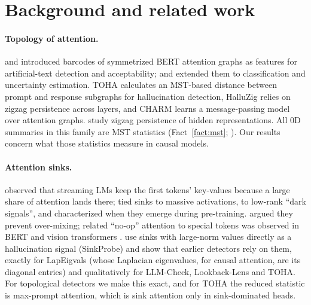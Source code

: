 \documentclass{article}
\theoremstyle{definition}
\begin{document}
\section{Background and related work}
\label{sec:related}

\paragraph{Topology of attention.} \citet{kushnareva2021} and \citet{cherniavskii2022} introduced barcodes of symmetrized BERT attention graphs as features for artificial-text detection and acceptability; \citet{perez2022topological} and \citet{kostenok2023} extended them to classification and uncertainty estimation. TOHA \citep{toha} calculates an MST-based distance between prompt and response subgraphs for hallucination detection, HalluZig \citep{samaga2026halluzig} relies on zigzag persistence across layers, and CHARM \citep{charm} learns a message-passing model over attention graphs. \citet{gardinazzi2024persistent} study zigzag persistence of hidden representations. All $0$D summaries in this family are MST statistics (Fact~\ref{fact:mst}; \citealp{gower1969}). Our results concern what those statistics measure in causal models.

\paragraph{Attention sinks.} \citet{xiao2023efficient} observed that streaming LMs keep the first tokens' key-values because a large share of attention lands there; \citet{sun2024massive} tied sinks to massive activations, \citet{cancedda2024spectral} to low-rank ``dark signals'', and \citet{gu2025attentionsink} characterized when they emerge during pre-training. \citet{barbero2025first} argued they prevent over-mixing; related ``no-op'' attention to special tokens was observed in BERT \citep{clark2019bert} and vision transformers \citep{darcet2024registers}. \citet{binkowski2026sinkprobe} use sinks with large-norm values directly as a hallucination signal (SinkProbe) and show that earlier detectors rely on them, exactly for LapEigvals (whose Laplacian eigenvalues, for causal attention, are its diagonal entries) and qualitatively for LLM-Check, Lookback-Lens and TOHA. For topological detectors we make this exact, and for TOHA the reduced statistic is max-prompt attention, which is sink attention only in sink-dominated heads.
\end{document}
